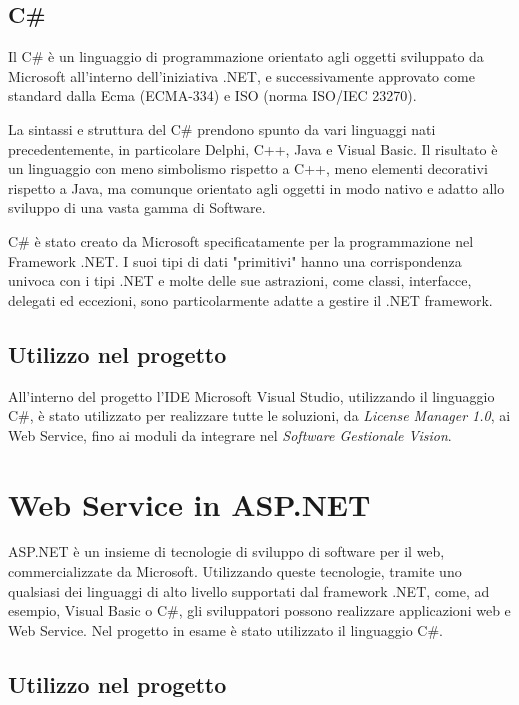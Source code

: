\subsection{C\#}
Il C\# è un linguaggio di programmazione orientato agli oggetti sviluppato da Microsoft all'interno dell'iniziativa .NET, e successivamente approvato come standard dalla Ecma (ECMA-334) e ISO (norma ISO/IEC 23270).

La sintassi e struttura del C\# prendono spunto da vari linguaggi nati precedentemente, in particolare Delphi, C++, Java e Visual Basic. Il risultato è un linguaggio con meno simbolismo rispetto a C++, meno elementi decorativi rispetto a Java, ma comunque orientato agli oggetti in modo nativo e adatto allo sviluppo di una vasta gamma di Software.

C\# è stato creato da Microsoft specificatamente per la programmazione nel Framework .NET. I suoi tipi di dati "primitivi" hanno una corrispondenza univoca con i tipi .NET e molte delle sue astrazioni, come classi, interfacce, delegati ed eccezioni, sono particolarmente adatte a gestire il .NET framework.


\subsection{Utilizzo nel progetto}

All'interno del progetto l'IDE Microsoft Visual Studio, utilizzando il linguaggio C\#, è stato utilizzato per realizzare tutte le soluzioni, da \textit{License Manager 1.0}, ai Web Service, fino ai moduli da integrare nel \textit{Software Gestionale Vision}. 

\section{Web Service in ASP.NET}

ASP.NET è un insieme di tecnologie di sviluppo di software per il web, commercializzate da Microsoft. Utilizzando queste tecnologie, tramite uno qualsiasi dei linguaggi di alto livello supportati dal framework .NET, come, ad esempio, Visual Basic o C\#, gli sviluppatori possono realizzare applicazioni web e Web Service.
Nel progetto in esame è stato utilizzato il linguaggio C\#{}.

\subsection{Utilizzo nel progetto}

